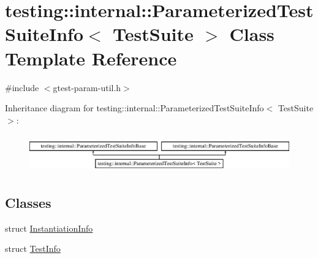 \hypertarget{classtesting_1_1internal_1_1_parameterized_test_suite_info}{}\section{testing\+::internal\+::Parameterized\+Test\+Suite\+Info$<$ Test\+Suite $>$ Class Template Reference}
\label{classtesting_1_1internal_1_1_parameterized_test_suite_info}


{\ttfamily \#include $<$gtest-\/param-\/util.\+h$>$}

Inheritance diagram for testing\+::internal\+::Parameterized\+Test\+Suite\+Info$<$ Test\+Suite $>$\+:\begin{figure}[H]
\begin{center}
\leavevmode
\includegraphics[height=1.656805cm]{d4/d72/classtesting_1_1internal_1_1_parameterized_test_suite_info}
\end{center}
\end{figure}
\subsection*{Classes}
\begin{DoxyCompactItemize}
\item 
struct \mbox{\hyperlink{structtesting_1_1internal_1_1_parameterized_test_suite_info_1_1_instantiation_info}{Instantiation\+Info}}
\item 
struct \mbox{\hyperlink{structtesting_1_1internal_1_1_parameterized_test_suite_info_1_1_test_info}{Test\+Info}}
\end{DoxyCompactItemize}
